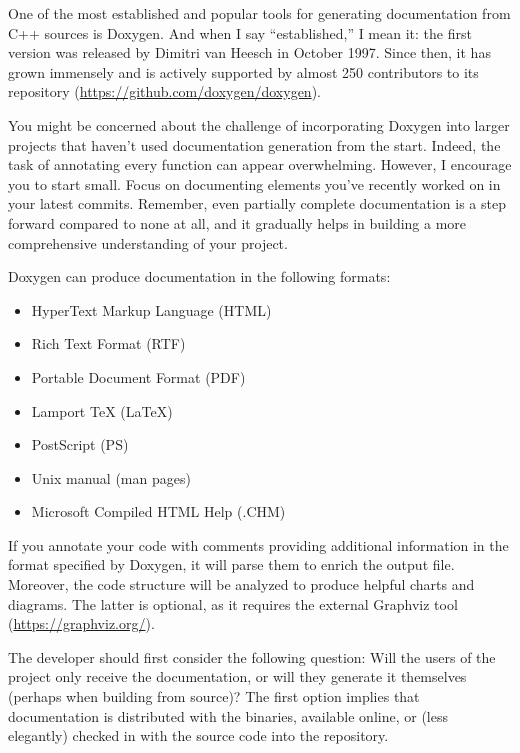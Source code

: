 One of the most established and popular tools for generating documentation from C++ sources is Doxygen. And when I say “established,” I mean it: the first version was released by Dimitri van Heesch in October 1997. Since then, it has grown immensely and is actively supported by almost 250 contributors to its repository (\url{https://github.com/doxygen/doxygen}).

You might be concerned about the challenge of incorporating Doxygen into larger projects that haven’t used documentation generation from the start. Indeed, the task of annotating every function can appear overwhelming. However, I encourage you to start small. Focus on documenting elements you’ve recently worked on in your latest commits. Remember, even partially complete documentation is a step forward compared to none at all, and it gradually helps in building a more comprehensive understanding of your project.

Doxygen can produce documentation in the following formats:

\begin{itemize}
\item
HyperText Markup Language (HTML)

\item
Rich Text Format (RTF)

\item
Portable Document Format (PDF)

\item
Lamport TeX (LaTeX)

\item
PostScript (PS)

\item
Unix manual (man pages)

\item
Microsoft Compiled HTML Help (.CHM)
\end{itemize}

If you annotate your code with comments providing additional information in the format specified by Doxygen, it will parse them to enrich the output file. Moreover, the code structure will be analyzed to produce helpful charts and diagrams. The latter is optional, as it requires the external Graphviz tool (\url{https://graphviz.org/}).

The developer should first consider the following question: Will the users of the project only receive the documentation, or will they generate it themselves (perhaps when building from source)? The first option implies that documentation is distributed with the binaries, available online, or (less elegantly) checked in with the source code into the repository.

